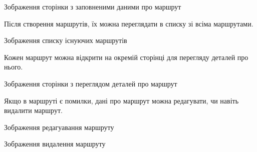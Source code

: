 Зображення сторінки з заповненими даними про маршрут


Після створення маршрутів, їх можна переглядати в списку зі всіма маршрутами.

Зображення списку існуючих маршрутів


Кожен маршрут можна відкрити на окремій сторінці для перегляду деталей  про нього.

Зображення сторінки з переглядом деталей про маршрут


Якщо в маршруті є помилки, дані про маршрут можна редагувати, чи навіть видалити маршрут.

Зображення редагуавання маршруту

Зображення видалення маршруту